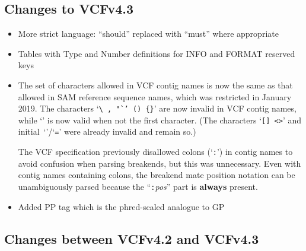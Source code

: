 \documentclass[8pt]{article}
\begin{document}
\subsection{Changes to VCFv4.3}

\begin{itemize}
\item More strict language: ``should'' replaced with ``must'' where appropriate
\item Tables with Type and Number definitions for INFO and FORMAT reserved keys

\item
The set of characters allowed in VCF contig names is now the same as that allowed in SAM reference sequence names, which was restricted in January 2019.
The characters `{\tt\verb|\|\,,\,"`'\,()\,\verb|{}|}' are now invalid in VCF contig names, while `{\tt *}' is now valid when not the first character.
(The characters `{\tt []\,<>}' and initial~`{\tt *}'/`{\tt =}' were already invalid and remain so.)

The VCF specification previously disallowed colons (`{\tt :}') in contig names to avoid confusion when parsing breakends, but this was unnecessary.
Even with contig names containing colons, the breakend mate position notation can be unambiguously parsed because the ``{\tt :}\emph{pos}'' part is \textbf{always} present.
\item Added PP tag which is the phred-scaled analogue to GP
\end{itemize}

\subsection{Changes between VCFv4.2 and VCFv4.3}
\end{document}
